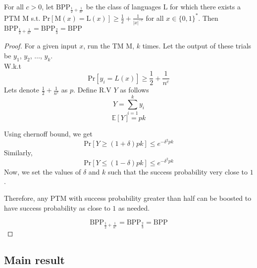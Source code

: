 \documentclass[../main.tex]{subfiles}
\begin{document}
\begin{lemma}
For all $c > 0$, let $\mathrm{BPP}_{\frac{1}{2}+\frac{1}{n^c}}$ be the class of languages $\mathrm{L}$ for which there exists a PTM $\mathrm{M}$ s.t. $\mathrm{Pr}[\mathrm{M}(x) = \mathrm{L}(x)] \ge \frac{1}{2} + \frac{1}{|x|^{-c}}$ for all $x \in \{0,1\}^*$. Then $\mathrm{BPP}_{\frac{1}{2}+\frac{1}{n^c}} = \mathrm{BPP}_{\frac{2}{3}} = \mathrm{BPP}$
\end{lemma}
\begin{proof}
For a given input $x$, run the TM $\mathrm{M}$, $k$ times. Let the output of these trials be $y_1$, $y_2$, $\hdots$, $y_k$.\\
\noindent W.k.t
\begin{equation*}
    \mathrm{Pr}[y_i = L(x)] \ge \frac{1}{2} + \frac{1}{n^c}
\end{equation*}
Lets denote $\frac{1}{2} + \frac{1}{n^c}$ as $p$. Define R.V $Y$ as follows
\begin{equation*}
    Y = \sum_{i=1}^{k}y_i
\end{equation*}
\begin{equation*}
    \mathbb{E}[Y] = pk
\end{equation*}

\noindent Using chernoff bound, we get
\begin{equation*}
    \mathrm{Pr}[Y \ge (1+\delta)pk] \le e^{-\delta^2pk}
\end{equation*}
\noindent Similarly,
\begin{equation*}
    \mathrm{Pr}[Y \le (1-\delta)pk] \le e^{-\delta^2pk}
\end{equation*}
\noindent Now, we set the values of $\delta$ and $k$ such that the success probability very close to $1$.

\noindent Therefore, any PTM with success probability greater than half can be boosted to have success probability as close to $1$ as needed.

\begin{equation*}
    \mathrm{BPP}_{\frac{1}{2}+\frac{1}{n^c}} = \mathrm{BPP}_{\frac{2}{3}} = \mathrm{BPP}
\end{equation*}

\end{proof}

\subsection{Main result}
\end{document}
